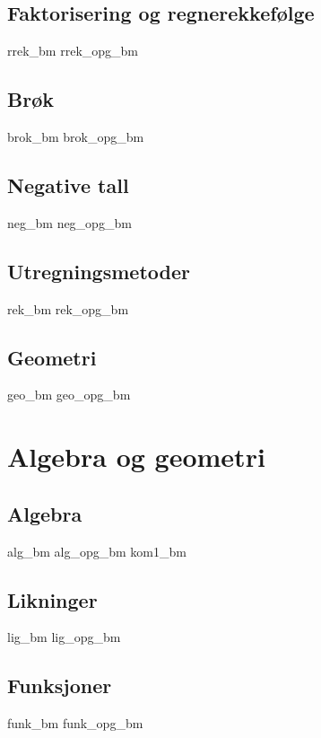 \chapter{Faktorisering og regnerekkefølge \label{Faktogrek}}
\newpage
{rrek_bm}
{rrek_opg_bm}

\chapter{Brøk \label{Brok}} 
\newpage
{brok_bm}
\newpage
{brok_opg_bm}

\chapter{Negative tall \label{Negtal}}
\newpage
{neg_bm}
{neg_opg_bm}

\chapter{Utregningsmetoder \label{Utrekning}}
\newpage
{rek_bm}
\newpage
{rek_opg_bm}

\chapter{Geometri \label{Geometri}}
\newpage
{geo_bm}
{geo_opg_bm}

\part{Algebra og geometri \label{Del2}}
\chapter{Algebra \label{Algebra}}
\newpage
{alg_bm}
{alg_opg_bm}
\newpage
{kom1_bm}

\chapter{Likninger \label{Likningar}}
\newpage
{lig_bm}
{lig_opg_bm}

\chapter{Funksjoner \label{Funksjoner}}
{funk_bm}
{funk_opg_bm}

